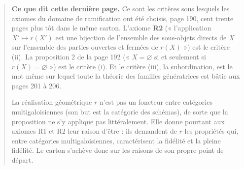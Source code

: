 \documentclass[11pt,a4paper]{article}
\begin{document}
\begin{quote}
\textbf{Ce que dit cette dernière page.} Ce
sont les critères sous lesquels les axiomes du domaine de ramification ont été
choisis, page 190, cent trente pages plus tôt dans le même carton. L'axiome
\textbf{R2} (« l'application $X' \mapsto r(X')$ est une bijection de
l'ensemble des sous-objets directs de $X$ sur l'ensemble des parties ouvertes
et fermées de $r(X)$ ») est le critère (ii). La proposition 2 de la page
192 (« $X = \varnothing$ si et seulement si $r(X) = \varnothing$ ») est
le critère (i). Et le critère (iii), la subordination, est le mot même sur
lequel toute la théorie des familles génératrices est bâtie aux pages 201 à
206.

La réalisation géométrique $r$ n'est pas un foncteur entre catégories
multigaloisiennes (son but est la catégorie des schémas), de sorte que la
proposition ne s'y applique pas littéralement. Elle donne pourtant
aux axiomes R1 et R2 leur raison d'être : ils demandent de $r$ les
propriétés qui, entre catégories multigaloisiennes, caractérisent la fidélité
et la pleine fidélité. Le carton s'achève donc sur les raisons de son propre
point de départ.
\end{quote}
\end{document}
